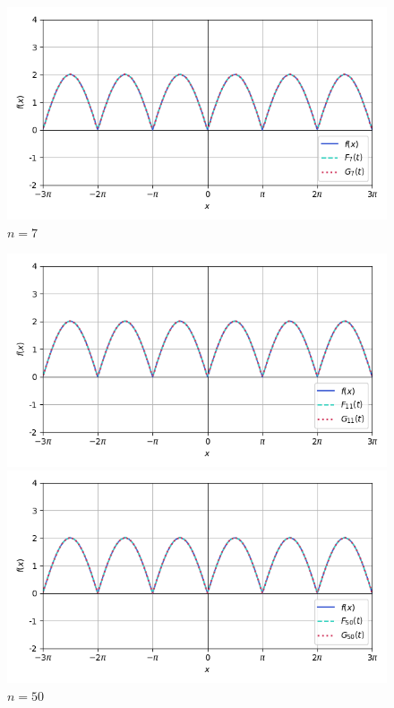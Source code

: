 \documentclass[a4paper]{article}
\begin{document}
\begin{figure}[H]
\begin{minipage}{0.5\textwidth}
        \caption{$n = 4$}
    \end{minipage}\hfill
    \begin{minipage}{0.5\textwidth}
        \centering \includegraphics[width=\textwidth]{even_func/7.png}
        \caption{$n = 7$}
    \end{minipage}
\end{figure}
\begin{figure}[H]
    \begin{minipage}{0.5\textwidth}
        \centering \includegraphics[width=\textwidth]{even_func/11.png}
        \caption{$n = 11$}
    \end{minipage}
    \begin{minipage}{0.5\textwidth}
        \centering \includegraphics[width=\textwidth]{even_func/50.png}
        \caption{$n = 50$}
    \end{minipage}
\end{figure}\noindent
\end{document}
